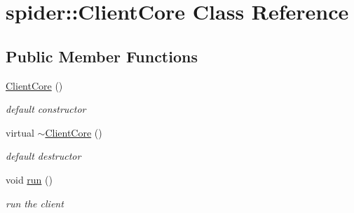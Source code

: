 \hypertarget{classspider_1_1_client_core}{}\section{spider\+:\+:Client\+Core Class Reference}
\label{classspider_1_1_client_core}
\subsection*{Public Member Functions}
\begin{DoxyCompactItemize}
\item 
\mbox{\label{classspider_1_1_client_core_af4477203892593d4739108be682a9089}} 
\hyperlink{classspider_1_1_client_core_af4477203892593d4739108be682a9089}{Client\+Core} ()
\begin{DoxyCompactList}\small\item\em default constructor \end{DoxyCompactList}\item 
\mbox{\label{classspider_1_1_client_core_a343e0b116ad0fd378fcd940a3e2603ed}} 
virtual \hyperlink{classspider_1_1_client_core_a343e0b116ad0fd378fcd940a3e2603ed}{$\sim$\+Client\+Core} ()
\begin{DoxyCompactList}\small\item\em default destructor \end{DoxyCompactList}\item 
\mbox{\label{classspider_1_1_client_core_aeffcae3283afd9c29a34f7a66aef2396}} 
void \hyperlink{classspider_1_1_client_core_aeffcae3283afd9c29a34f7a66aef2396}{run} ()
\begin{DoxyCompactList}\small\item\em run the client \end{DoxyCompactList}\end{DoxyCompactItemize}
